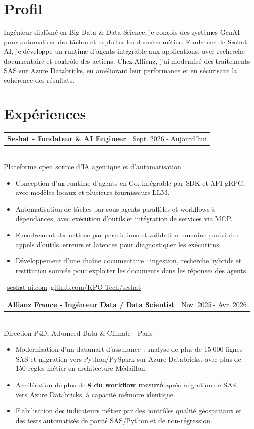 \documentclass[10pt,a4paper]{article}
\makeatletter
\newcommand{\role}[3]{%
  \vspace{3pt}
  \begin{tabularx}{\linewidth}{@{}Xr@{}}
  \textbf{#1} & {\color{muted}#2}
  \end{tabularx}\vspace{0.8pt}\\
  {\color{muted}#3}\par
  \vspace{3pt}
}
\makeatother
\begin{document}
\begin{lrbox}{\maincolumnbox}
\begin{minipage}[t]{0.695\textwidth}
\vspace{0pt}
\raggedright

\section{Profil}
Ingénieur diplômé en Big Data \& Data Science, je conçois des systèmes GenAI pour automatiser des tâches et exploiter les données métier. Fondateur de Seshat AI, je développe un runtime d'agents intégrable aux applications, avec recherche documentaire et contrôle des actions. Chez Allianz, j'ai modernisé des traitements SAS sur Azure Databricks, en améliorant leur performance et en sécurisant la cohérence des résultats.

\section{Expériences}
\role{Seshat - Fondateur \& AI Engineer}{Sept. 2026 - Aujourd'hui}{Plateforme open source d'IA agentique et d'automatisation}
\begin{itemize}
  \item Conception d'un runtime d'agents en Go, intégrable par SDK et API gRPC, avec modèles locaux et plusieurs fournisseurs LLM.
  \item Automatisation de tâches par sous-agents parallèles et workflows à dépendances, avec exécution d'outils et intégration de services via MCP.
  \item Encadrement des actions par permissions et validation humaine ; suivi des appels d'outils, erreurs et latences pour diagnostiquer les exécutions.
  \item Développement d'une chaîne documentaire : ingestion, recherche hybride et restitution sourcée pour exploiter les documents dans les réponses des agents.
\end{itemize}
{\footnotesize\color{accent}\ \href{https://seshat-ai.com}{seshat-ai.com}\enspace\textbullet\enspace{}\ \href{https://github.com/KPO-Tech/seshat}{github.com/KPO-Tech/seshat}}\par

\vspace{8pt}
\role{Allianz France - Ingénieur Data / Data Scientist}{Nov. 2025 - Avr. 2026}{Direction P4D, Advanced Data \& Climate - Paris}
\begin{itemize}
  \item Modernisation d'un datamart d'assurance : analyse de plus de 15 000 lignes SAS et migration vers Python/PySpark sur Azure Databricks, avec plus de 150 règles métier en architecture Médaillon.
  \item Accélération de plus de \textbf{8\texttimes{} du workflow mesuré} après migration de SAS vers Azure Databricks, à capacité mémoire identique.
  \item Fiabilisation des indicateurs métier par des contrôles qualité géospatiaux et des tests automatisés de parité SAS/Python et de non-régression.
\end{itemize}


\end{minipage}
\end{lrbox}
\end{document}
